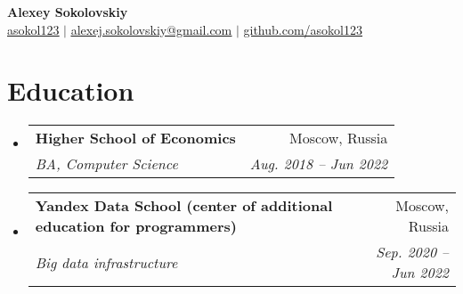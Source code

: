 \documentclass[letterpaper,11pt]{article}
\makeatletter
\newcommand{\resumeSubheading}[4]{
  \vspace{-2pt}\item
    \begin{tabular*}{0.97\textwidth}[t]{l@{\extracolsep{\fill}}r}
      \textbf{#1} & #2 \\
      \textit{\small#3} & \textit{\small #4} \\
    \end{tabular*}\vspace{-7pt}
}
\newcommand{\resumeSubHeadingListStart}{\begin{itemize}[leftmargin=0.15in, label={}]}
\newcommand{\resumeSubHeadingListEnd}{\end{itemize}}
\makeatother
\begin{document}

\begin{center}
    \textbf{\Huge Alexey Sokolovskiy} \\ \vspace{1pt}
    \small \href{https://t.me/asokol123}{\underline{ asokol123}} $|$ \href{mailto:alexej.sokolovskiy@gmail.com}{\underline{alexej.sokolovskiy@gmail.com}} $|$ 
    \href{https://github.com/asokol123}{\underline{ github.com/asokol123}}
\end{center}


\section{Education}
  \resumeSubHeadingListStart
    \resumeSubheading
      {Higher School of Economics}{Moscow, Russia}
      {BA, Computer Science}{Aug. 2018 -- Jun 2022}
    \resumeSubheading
      {Yandex Data School (center of additional education for programmers)}{Moscow, Russia}
      {Big data infrastructure}{Sep. 2020 -- Jun 2022}
  \resumeSubHeadingListEnd


\end{document}
